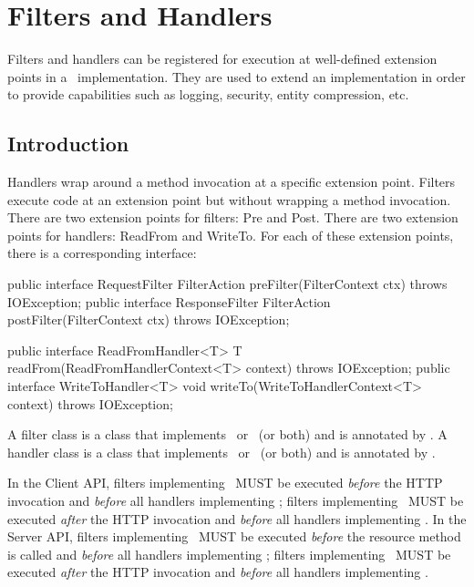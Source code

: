 \chapter{Filters and Handlers}
\label{filters_and_handlers}

Filters and handlers can be registered for execution at well-defined extension points in a \jaxrs\ implementation. They are used to extend an implementation in order to provide capabilities such as logging, security, entity compression, etc. 

\section{Introduction}
\label{introduction_filters}
Handlers wrap around a method invocation at a specific extension point. Filters execute code at an extension point but without wrapping a method invocation. There are two extension points for filters: Pre and Post. There are two extension points for handlers: ReadFrom and WriteTo.  For each of these extension points, there is a corresponding interface:

\begin{listing}{1}
public interface RequestFilter {
    FilterAction preFilter(FilterContext ctx) throws IOException;
}
public interface ResponseFilter {
    FilterAction postFilter(FilterContext ctx) throws IOException;
}
\end{listing}

\begin{listing}{1}
public interface ReadFromHandler<T> {
    T readFrom(ReadFromHandlerContext<T> context) throws IOException;
}
public interface WriteToHandler<T> {
    void writeTo(WriteToHandlerContext<T> context) throws IOException;
}
\end{listing}

A filter class is a class that implements \RequestFilter\ or \ResponseFilter\ (or both) and is annotated by \Provider. A handler class is a class that implements \ReadFromHandler\ or \WriteToHandler\ (or both) and is annotated by \Provider. 

In the Client API, filters implementing \RequestFilter\ MUST be executed \emph{before} the HTTP invocation and \emph{before} all handlers implementing \WriteToHandler; filters implementing \ResponseFilter\ MUST be executed \emph{after} the HTTP invocation and \emph{before} all handlers implementing \ReadFromHandler. 
In the Server API, filters implementing \RequestFilter\ MUST be executed \emph{before} the resource method is called and \emph{before} all handlers implementing \ReadFromHandler; filters implementing \ResponseFilter\ MUST be executed \emph{after} the HTTP invocation and \emph{before} all handlers implementing \WriteToHandler. 

